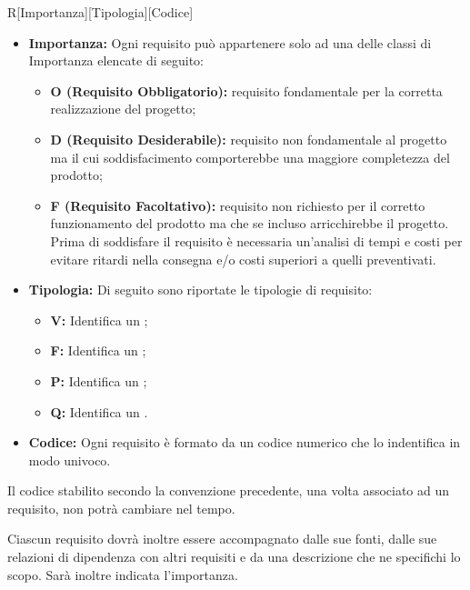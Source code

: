 \documentclass[../NomeDocumento.tex]{subfiles}
\begin{document}
	\begin{center}
		R[Importanza][Tipologia][Codice]
	\end{center}
	
		\begin{itemize}
			\item \textbf{Importanza:} Ogni requisito può appartenere solo ad una delle classi di Importanza elencate di seguito:
			\begin{itemize}
				\item \textbf{O (Requisito Obbligatorio):} requisito fondamentale per la corretta realizzazione del progetto;
				\item \textbf{D (Requisito Desiderabile):} requisito non fondamentale al progetto ma il cui soddisfacimento comporterebbe una maggiore completezza del prodotto;
				\item \textbf{F (Requisito Facoltativo):} requisito non richiesto per il corretto funzionamento del prodotto ma che se incluso arricchirebbe il progetto. Prima di soddisfare il requisito è necessaria un’analisi di tempi e costi per evitare ritardi nella consegna e/o costi superiori a quelli preventivati.
			\end{itemize}
			\item \textbf{Tipologia:} Di seguito sono riportate le tipologie di requisito:
			\begin{itemize}
				\item \textbf{V:} Identifica un ;
				\item \textbf{F:} Identifica un ;
				\item \textbf{P:} Identifica un ;
				\item \textbf{Q:} Identifica un .
			\end{itemize}
		\item \textbf{Codice:} Ogni requisito è formato da un codice numerico che lo indentifica in modo univoco.
		\end{itemize}
	
	\noindent Il codice stabilito secondo la convenzione precedente, una volta associato ad un requisito, non potrà cambiare nel tempo.
	
	\noindent Ciascun requisito dovrà inoltre essere accompagnato dalle sue fonti, dalle sue relazioni di dipendenza con altri requisiti e da una descrizione che ne specifichi lo scopo. Sarà inoltre indicata l'importanza.\\
	
\end{document}
